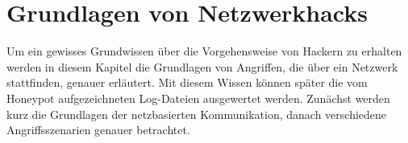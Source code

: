 \section{Grundlagen von Netzwerkhacks}
Um ein gewisses Grundwissen über die Vorgehensweise von Hackern zu erhalten werden in diesem Kapitel die Grundlagen von Angriffen, die über ein Netzwerk stattfinden, genauer erläutert. Mit diesem Wissen können später die vom Honeypot aufgezeichneten Log-Dateien ausgewertet werden.
Zunächst werden kurz die Grundlagen der netzbasierten Kommunikation, danach verschiedene Angriffsszenarien genauer betrachtet.  



